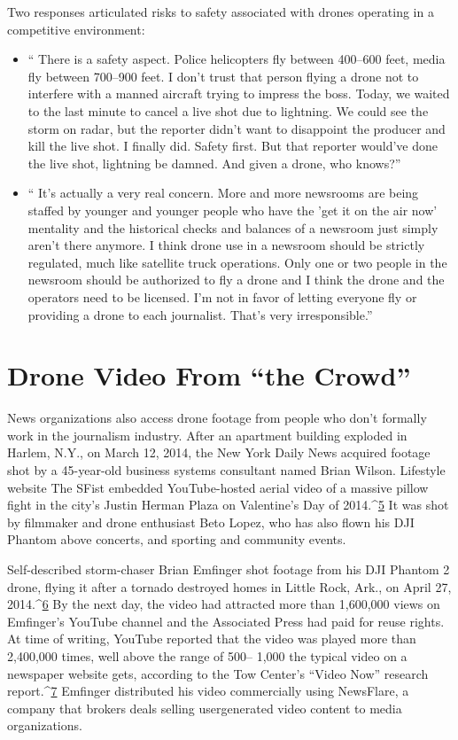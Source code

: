 Two responses articulated risks to safety associated with drones operating
in a competitive environment:
\begin{itemize}
\item `` There is a safety aspect. Police helicopters fly between 400–600
feet, media fly between 700–900 feet. I don't trust that person
flying a drone not to interfere with a manned aircraft trying to
impress the boss. Today, we waited to the last minute to cancel
a live shot due to lightning. We could see the storm on radar,
but the reporter didn't want to disappoint the producer and kill
the live shot. I finally did. Safety first. But that reporter would've
done the live shot, lightning be damned. And given a drone,
who knows?''
\item `` It's actually a very real concern. More and more newsrooms are
being staffed by younger and younger people who have the 'get
it on the air now' mentality and the historical checks and balances
of a newsroom just simply aren't there anymore. I think
drone use in a newsroom should be strictly regulated, much
like satellite truck operations. Only one or two people in the
newsroom should be authorized to fly a drone and I think the
drone and the operators need to be licensed. I'm not in favor of
letting everyone fly or providing a drone to each journalist.
That's very irresponsible.''
\end{itemize}
\section{Drone Video From ``the Crowd''}

News organizations also access drone footage from people who don't formally
work in the journalism industry. After an apartment building exploded
in Harlem, N.Y., on March 12, 2014, the New York Daily News acquired footage
shot by a 45-year-old business systems consultant named Brian Wilson.
Lifestyle website The SFist embedded YouTube-hosted aerial video of a
massive pillow fight in the city's Justin Herman Plaza on Valentine's Day of
2014.^{\href{#endnotes-industry-overview}{5}} It was shot by filmmaker and drone enthusiast Beto Lopez, who has
also flown his DJI Phantom above concerts, and sporting and community
events.

Self-described storm-chaser Brian Emfinger shot footage from his DJI
Phantom 2 drone, flying it after a tornado destroyed homes in Little Rock,
Ark., on April 27, 2014.^{\href{#endnotes-industry-overview}{6}} By the next day, the video had attracted more than
1,600,000 views on Emfinger's YouTube channel and the Associated Press
had paid for reuse rights. At time of writing, YouTube reported that the
video was played more than 2,400,000 times, well above the range of 500–
1,000 the typical video on a newspaper website gets, according to the Tow Center's ``Video Now'' research report.^{\href{#endnotes-industry-overview}{7}} Emfinger distributed his video
commercially using NewsFlare, a company that brokers deals selling usergenerated
video content to media organizations.

